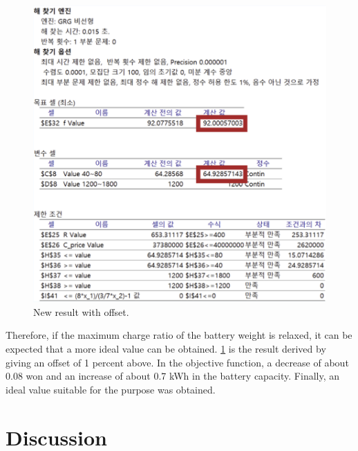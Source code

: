 \documentclass[11pt,twocolumn]{article}
\begin{document}
            \begin{figure}[h]
                    \centering
                    \includegraphics[width=.8\columnwidth]{Excel88.png}
                    \caption{New result with offset.}
                    \label{sense2}
            \end{figure}

            Therefore, if the maximum charge ratio of the battery weight is relaxed, it can be expected that a more ideal value can be obtained.
            \cref{sense2} is the result derived by giving an offset of 1 percent above.
            In the objective function, a decrease of about 0.08 won and an increase of about 0.7 kWh in the battery capacity.
            Finally, an ideal value suitable for the purpose was obtained.


    \section{Discussion}
\end{document}
